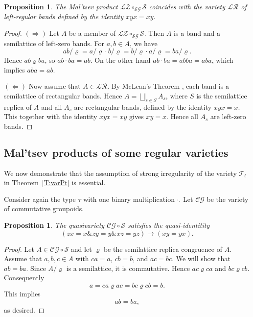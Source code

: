 \documentclass{birkau}
\newcommand{\mc}{\mathcal}
\newcommand{\mcT}{\mathcal{T}}
\newcommand{\mcS}{\mathcal{S}}
\theoremstyle{plain}
\newtheorem{proposition}[theorem]{Proposition}
\theoremstyle{definition}
\numberwithin{equation}{section}
\begin{document}
\begin{proposition}\label{P:LZSSG}
The Mal'tsev product $\mc{LZ} \circ_{\mc{SG}} \mcS$ coincides with the variety $\mc{LR}$ of left-regular bands defined by the identity $xyx = xy$.
\end{proposition}
\begin{proof}
$(\Rightarrow)$
Let $A$ be a member of $\mc{LZ} \circ_{\mc{SG}} \mcS$. Then $A$ is a band and a semilattice of left-zero bands. For $a, b \in A$, we have
\begin{equation*}
ab/\varrho = a/\varrho \cdot b/\varrho = b/\varrho \cdot a/\varrho = ba/\varrho.
\end{equation*}
Hence $ab \mathrel{\varrho} ba$, so $ab \cdot ba = ab$. On the other hand $ab \cdot ba = abba = aba$, which implies $aba = ab$.

$(\Leftarrow)$
Now assume that $A \in \mc{LR}$. By McLean's Theorem \cite{Mc54}, each band is a
semilattice of rectangular bands. Hence $A = \bigsqcup_{s \in S} A_s$, where $S$ is the
semilattice replica of $A$ and all $A_s$ are rectangular bands, defined by the identity
$xyx = x$. This together with the identity $xyx = xy$ gives $xy = x$. Hence all $A_s$ are
left-zero bands.
\end{proof}



\subsection{Mal'tsev products of some regular varieties}\label{S:CGS}
We now demonstrate that the assumption of strong irregularity of the variety $\mcT_t$ in
Theorem~\ref{T:varPt} is essential.

Consider again the type $\tau$ with one binary multiplication $\cdot$. Let $\mc{CG}$ be the variety of commutative groupoids.

\begin{proposition}\label{P:CGS quasi}
The quasivariety $\mc{CG} \circ \mcS$ satisfies the quasi-identitity
\begin{equation}\label{E:qcg}
(zx = x \mathrel{\&} zy = y \mathrel{\&} xz = yz) \rightarrow (xy = yx).
\end{equation}
\end{proposition}
\begin{proof}
Let $A\in \mc{CG} \circ \mcS$ and let $\varrho$ be the semilattice replica congruence of $A$. Assume that
$a, b, c \in A$ with $ca = a$, $cb = b$, and $ac = bc$. We will show that $ab = ba$.
Since $A/\varrho$ is a semilattice, it is commutative. Hence $ac \mathrel{\varrho} ca$
and $bc \mathrel{\varrho} cb$. Consequently
\begin{equation*}
a = ca \mathrel{\varrho} ac = bc \mathrel{\varrho} cb = b.
\end{equation*}
This implies
\begin{equation*}
ab = ba,
\end{equation*}
as desired.
\end{proof}
\end{document}
